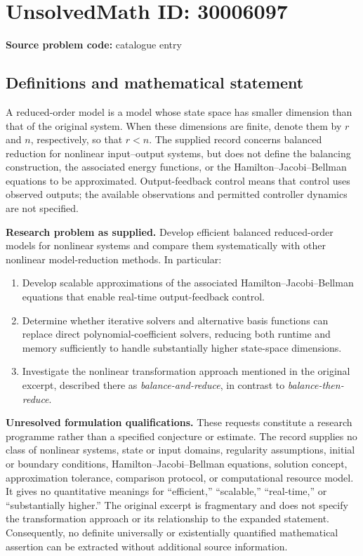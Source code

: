 \documentclass[11pt]{article}
\begin{document}
\section*{UnsolvedMath ID: 30006097}
\textbf{Source problem code:} catalogue entry
\subsection{Definitions and mathematical statement}
A reduced-order model is a model whose state space has smaller dimension than that of the original system. When these dimensions are finite, denote them by \(r\) and \(n\), respectively, so that \(r<n\). The supplied record concerns balanced reduction for nonlinear input--output systems, but does not define the balancing construction, the associated energy functions, or the Hamilton--Jacobi--Bellman equations to be approximated. Output-feedback control means that control uses observed outputs; the available observations and permitted controller dynamics are not specified.

\textbf{Research problem as supplied.} Develop efficient balanced reduced-order models for nonlinear systems and compare them systematically with other nonlinear model-reduction methods. In particular:
\begin{enumerate}
\item Develop scalable approximations of the associated Hamilton--Jacobi--Bellman equations that enable real-time output-feedback control.
\item Determine whether iterative solvers and alternative basis functions can replace direct polynomial-coefficient solvers, reducing both runtime and memory sufficiently to handle substantially higher state-space dimensions.
\item Investigate the nonlinear transformation approach mentioned in the original excerpt, described there as \emph{balance-and-reduce}, in contrast to \emph{balance-then-reduce}.
\end{enumerate}

\textbf{Unresolved formulation qualifications.} These requests constitute a research programme rather than a specified conjecture or estimate. The record supplies no class of nonlinear systems, state or input domains, regularity assumptions, initial or boundary conditions, Hamilton--Jacobi--Bellman equations, solution concept, approximation tolerance, comparison protocol, or computational resource model. It gives no quantitative meanings for ``efficient,'' ``scalable,'' ``real-time,'' or ``substantially higher.'' The original excerpt is fragmentary and does not specify the transformation approach or its relationship to the expanded statement. Consequently, no definite universally or existentially quantified mathematical assertion can be extracted without additional source information.
\end{document}
